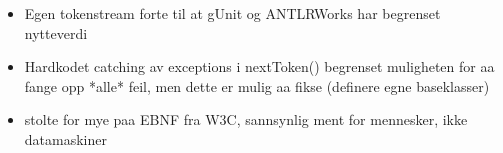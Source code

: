 \begin{itemize}
\item Egen tokenstream forte til at gUnit og ANTLRWorks har begrenset nytteverdi
\item Hardkodet catching av exceptions i nextToken() begrenset muligheten for aa
fange opp *alle* feil, men dette er mulig aa fikse (definere egne baseklasser)
\item stolte for mye paa EBNF fra W3C, sannsynlig ment for mennesker, ikke datamaskiner
\end{itemize}